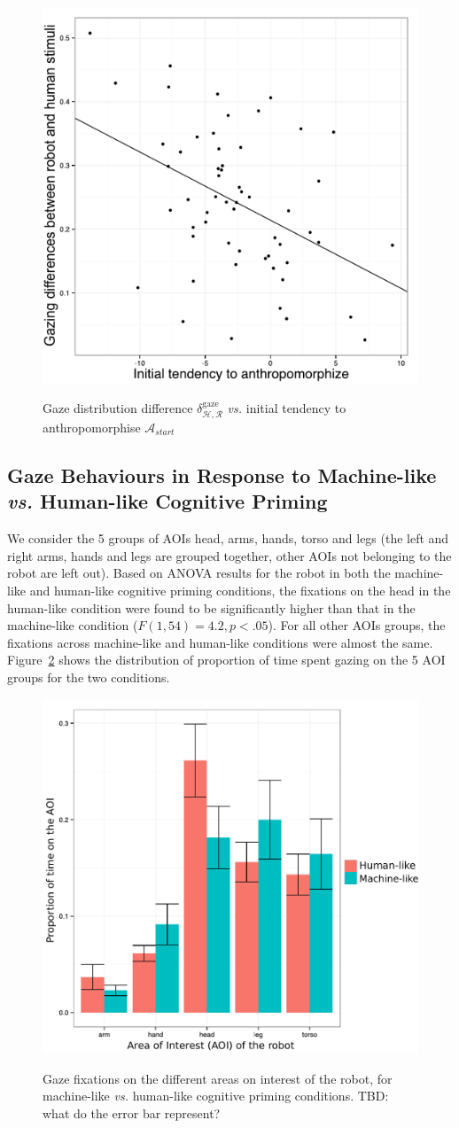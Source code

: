 \documentclass[lettersize, noapacite, twoside, HRI]{apa_HRI}
\newcommand{\vs}{\textit{vs.}\xspace}
\newcommand{\anti}{{$\mathcal{A}_{start}$\xspace}}
\begin{document}
\begin{figure}
    \centering
    \includegraphics[width=0.5\columnwidth]{H2}\label{GazeDifference-vs-ICA}
    \caption{Gaze distribution difference $\delta_{\mathcal{H},
    \mathcal{R}}^{\text{gaze}}$ \vs initial tendency to anthropomorphise \anti{}}
    \label{h2}
\end{figure}

\subsection{Gaze Behaviours in Response to Machine-like \vs Human-like Cognitive Priming}

We consider the 5 groups of AOIs {\sf head}, {\sf arms}, {\sf hands}, {\sf
torso} and {\sf legs} (the left and right arms, hands and legs are grouped
together, other AOIs not belonging to the robot are left out). Based on ANOVA results for the robot in both the machine-like and human-like
cognitive priming conditions, the fixations on the head in the human-like condition
were found to be significantly higher than that in the machine-like condition
($F(1,54) = 4.2, p < .05$). For all other AOIs groups, the fixations across
machine-like and human-like conditions were almost the same. Figure~\ref{h3} shows the
distribution of proportion of time spent gazing on the 5 AOI groups for the two
conditions.

\begin{figure}[ht!]
    \centering
    \includegraphics[width=0.6\columnwidth]{GazeHighLow}\label{GazeHighLow}
    \caption{Gaze fixations on the different areas on interest of the robot, for machine-like \vs
    human-like cognitive priming conditions. TBD: what do the error bar represent?}
    \label{h3}
\end{figure}
\end{document}
